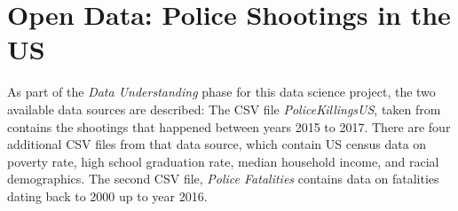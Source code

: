 \documentclass[11pt, journal]{IEEEtran}
\begin{document}
\section{Open Data: Police Shootings in the US} \label{sec:dataunderstanding}
As part of the \emph{Data Understanding} phase for this data science project, the two available data sources are described: The CSV file \emph{PoliceKillingsUS}, taken from \cite{kaggle} contains the shootings that happened between years 2015 to 2017. There are four additional CSV files from that data source, which contain US census data on poverty rate, high school graduation rate, median household income, and racial demographics. The second CSV file, \emph{Police Fatalities} \cite{dataworld} contains data on fatalities dating back to 2000 up to year 2016.

\end{document}

